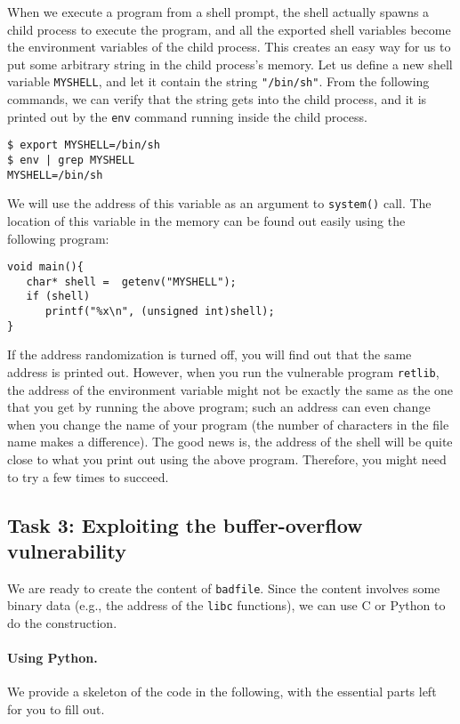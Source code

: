 When we execute a program from a shell prompt, the shell actually 
spawns a child process to execute the program, and all 
the exported shell variables become the environment variables 
of the child process. This creates an easy way for us to 
put some arbitrary string in the child process's memory. 
Let us define a new shell variable \texttt{MYSHELL}, and let it
contain the string \texttt{"/bin/sh"}. From the following commands,
we can verify that the string gets into the child process, and it is 
printed out by the \texttt{env} command running inside the child process.

\begin{lstlisting}
$ export MYSHELL=/bin/sh
$ env | grep MYSHELL
MYSHELL=/bin/sh
\end{lstlisting}

We will use the address of this variable as an argument to {\tt system()} call.
The location of this variable in the memory can be found out easily using the 
following program: 

\begin{lstlisting}
void main(){
   char* shell =  getenv("MYSHELL");
   if (shell) 
      printf("%x\n", (unsigned int)shell);
}
\end{lstlisting}


If the address randomization is turned off, you will find out that the same 
address is printed out. However, when you run the 
vulnerable program \texttt{retlib}, the address of the environment
variable might not be exactly the same as the one that you get by running 
the above program; such an address can even change when you change
the name of your program (the number of characters in the file
name makes a difference). The good news is, the address of the shell will
be quite close to what you print out using the above program. Therefore,
you might need to try a few times to succeed.



\subsection{Task 3: Exploiting the buffer-overflow vulnerability} 

We are ready to create the content of \texttt{badfile}. Since 
the content involves some binary data (e.g., the address of the 
\texttt{libc} functions), we can use C or Python to do the construction.  


\paragraph{Using Python.}
We provide a skeleton of the code in the following, with the essential 
parts left for you to fill out.


